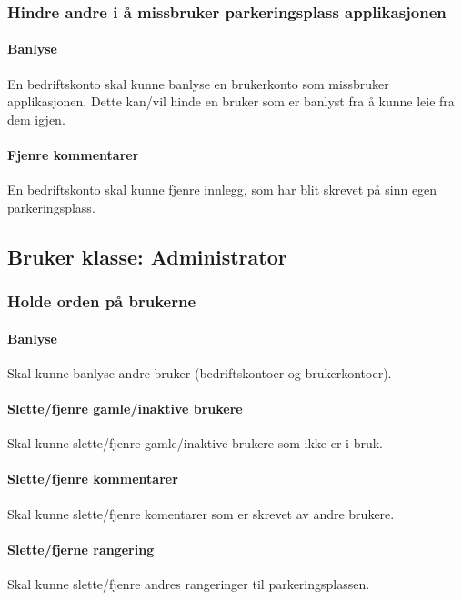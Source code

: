 \documentclass[12pt]{article}
\begin{document}
        \subsubsection{Hindre andre i å missbruker parkeringsplass applikasjonen}

            \paragraph{Banlyse}
            En bedriftskonto skal kunne banlyse en brukerkonto som missbruker applikasjonen. Dette kan/vil hinde en bruker som er banlyst fra å kunne leie fra dem igjen.

            \paragraph{Fjenre kommentarer}
            En bedriftskonto skal kunne fjenre innlegg, som har blit skrevet på sinn egen parkeringsplass.

    \subsection{Bruker klasse: Administrator}

        \subsubsection{Holde orden på brukerne}

            \paragraph{Banlyse}
            Skal kunne banlyse andre bruker (bedriftskontoer og brukerkontoer).

            \paragraph{Slette/fjenre gamle/inaktive brukere}
            Skal kunne slette/fjenre gamle/inaktive brukere som ikke er i bruk.

            \paragraph{Slette/fjenre kommentarer}
            Skal kunne slette/fjenre komentarer som er skrevet av andre brukere.

            \paragraph{Slette/fjerne rangering}
            Skal kunne slette/fjenre andres rangeringer til parkeringsplassen.
    
\end{document}
